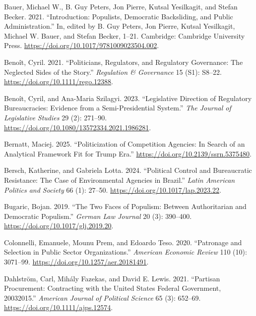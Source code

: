 \documentclass[
  11pt,
  letterpaper,
  DIV=11,
  numbers=noendperiod]{scrartcl}
\newlength{\cslhangindent}
\newenvironment{CSLReferences}[2] %
 {\begin{list}{}{%
  \setlength{\itemindent}{0pt}
  \setlength{\leftmargin}{0pt}
  \setlength{\parsep}{0pt}
  \ifodd #1
   \setlength{\leftmargin}{\cslhangindent}
   \setlength{\itemindent}{-1\cslhangindent}
  \fi
  \setlength{\itemsep}{#2\baselineskip}}}
 {\end{list}}
\begin{document}
\label{refs}
\begin{CSLReferences}{1}{0}
Bauer, Michael W., B. Guy Peters, Jon Pierre, Kutsal Yesilkagit, and
Stefan Becker. 2021. {``Introduction: Populists, Democratic Backsliding,
and Public Administration.''} In, edited by B. Guy Peters, Jon Pierre,
Kutsal Yesilkagit, Michael W. Bauer, and Stefan Becker, 1--21.
Cambridge: Cambridge University Press.
\url{https://doi.org/10.1017/9781009023504.002}.

Benoît, Cyril. 2021. {``Politicians, Regulators, and Regulatory
Governance: The Neglected Sides of the Story.''} \emph{Regulation \&
Governance} 15 (S1): S8--22. \url{https://doi.org/10.1111/rego.12388}.

Benoît, Cyril, and Ana-Maria Szilagyi. 2023. {``Legislative Direction of
Regulatory Bureaucracies: Evidence from a Semi-Presidential System.''}
\emph{The Journal of Legislative Studies} 29 (2): 271--90.
\url{https://doi.org/10.1080/13572334.2021.1986281}.

Bernatt, Maciej. 2025. {``Politicization of Competition Agencies: In
Search of an Analytical Framework Fit for Trump Era.''}
\url{https://doi.org/10.2139/ssrn.5375480}.

Bersch, Katherine, and Gabriela Lotta. 2024. {``Political Control and
Bureaucratic Resistance: The Case of Environmental Agencies in
Brazil.''} \emph{Latin American Politics and Society} 66 (1): 27--50.
\url{https://doi.org/10.1017/lap.2023.22}.

Bugaric, Bojan. 2019. {``The Two Faces of Populism: Between
Authoritarian and Democratic Populism.''} \emph{German Law Journal} 20
(3): 390--400. \url{https://doi.org/10.1017/glj.2019.20}.

Colonnelli, Emanuele, Mounu Prem, and Edoardo Teso. 2020. {``Patronage
and Selection in Public Sector Organizations.''} \emph{American Economic
Review} 110 (10): 3071--99. \url{https://doi.org/10.1257/aer.20181491}.

Dahlström, Carl, Mihály Fazekas, and David E. Lewis. 2021. {``Partisan
Procurement: Contracting with the United States Federal Government,
2003{\textendash}2015.''} \emph{American Journal of Political Science}
65 (3): 652--69. \url{https://doi.org/10.1111/ajps.12574}.


\end{CSLReferences}
\end{document}
